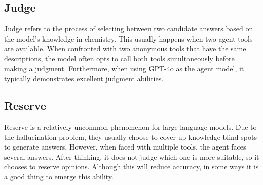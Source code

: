 \subsection{Judge}
Judge refers to the process of selecting between two candidate answers based on the model’s knowledge in chemistry. This usually happens when two agent tools are available. When confronted with two anonymous tools that have the same descriptions, the model often opts to call both tools simultaneously before making a judgment. Furthermore, when using GPT-4o as the agent model, it typically demonstrates excellent judgment abilities.
\subsection{Reserve}
Reserve is a relatively uncommon phenomenon for large language models. Due to the hallucination problem, they usually choose to cover up knowledge blind spots to generate answers. However, when faced with multiple tools, the agent faces several answers. After thinking, it does not judge which one is more suitable, so it chooses to reserve opinions. Although this will reduce accuracy, in some ways it is a good thing to emerge this ability.


